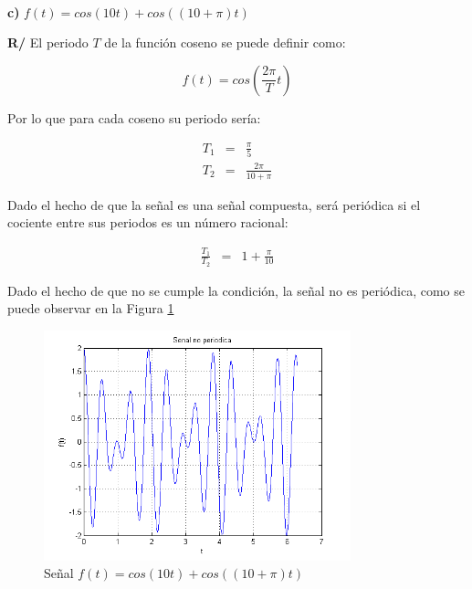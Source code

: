 \documentclass[a4paper]{article}
\begin{document}
$\,$

\textbf{c)} $f(t) = cos(10t) + cos((10+\pi)t)$

\textbf{R/} El periodo $T$ de la función coseno se puede definir como:

$$f(t) = cos\left(\frac{2\pi}{T}t\right)$$

Por lo que para cada coseno su periodo sería:

\begin{eqnarray*}
T_1 &=& \frac{\pi}{5}\\
T_2 &=& \frac{2\pi}{10 + \pi}
\end{eqnarray*}

Dado el hecho de que la señal es una señal compuesta, será periódica si el cociente entre sus periodos es un número racional:

\begin{eqnarray*}
\frac{T_1}{T_2} &=& 1 + \frac{\pi}{10}
\end{eqnarray*}

Dado el hecho de que no se cumple la condición, la señal no es periódica, como se puede observar en la Figura \ref{fig_5c}

\begin{figure}[!t]
\centering
\includegraphics[width=3.5in]{imgs/5c.png}
\caption{Señal $f(t) = cos(10t) + cos((10+\pi)t)$}
\label{fig_5c}
\end{figure}
\end{document}
